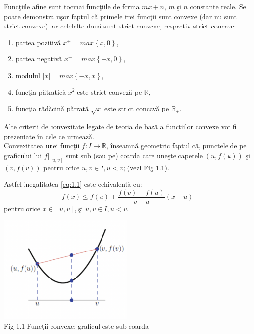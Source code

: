 \documentclass[a4paper,12pt,oneside]{report}
\begin{document}
Func\c{t}iile afine sunt tocmai func\c{t}iile de forma \(mx + n\),  \(m\) \c{s}i \(n\) constante reale.
Se poate demonstra u\c{s}or faptul c\u{a} primele trei func\c{t}ii sunt convexe (dar nu sunt strict convexe) iar celelalte dou\u{a} sunt strict convexe, respectiv strict concave:
\begin{enumerate}
  \item partea pozitiv\u{a} \(x^{+} = max \left \{ x,0 \right \}\),
  \item partea negativ\u{a} \(x^{-} = max \left \{ -x,0 \right \}\),
  \item modulul \(\left | x \right | = max \left \{ -x,x \right \}\),
  \item func\c{t}ia p\u{a}tratic\u{a} \(x^{2}\)  este strict convex\u{a} pe \(\mathbb{R}\),
  \item func\c{t}ia r\u{a}d\u{a}cin\u{a} p\u{a}trat\u{a} \(\sqrt{x}\) este strict concav\u{a} pe \(\mathbb{R}_{+}\).
\end{enumerate}

Alte criterii de convexitate legate de teoria de baz\u{a} a func{t}iilor convexe vor fi prezentate \^{i}n cele ce urmeaz\u{a}.\\

Convexitatea unei func\c{t}ii \(f : I\rightarrow \mathbb{R}\), \^{i}nseamn\u{a} geometric faptul c\u{a}, punctele de pe graficului lui  \(f|_{\left [ u,v \right ]}\) sunt sub (sau pe) coarda care une\c{s}te capetele \(\left ( u , f {\left ( u \right )} \right )\)  \c{s}i \(\left ( v , f {\left ( v \right )} \right )\) pentru orice \(u, v \in I, u < v\);
(vezi Fig 1.1).

Astfel inegalitatea \ref{eq:1.1} este echivalent\u{a} cu:
\begin{displaymath}
  f\left ( x \right )\leq f\left ( u \right ) +\frac{f\left ( v \right )- f\left ( u \right )}{v - u}\left ( x - u \right ) \label{eq:1.2} \tag{1.2}
\end{displaymath}
pentru orice \(x\in \left [  u, v\right ]\), \c{s}i \(u, v \in I, u < v\).

\begin{center}
	\includegraphics[width=0.5\textwidth]{fig1.1.png}
	\\ Fig 1.1 Func\c{t}ii convexe: graficul este sub coarda
\end{center}
\end{document}
